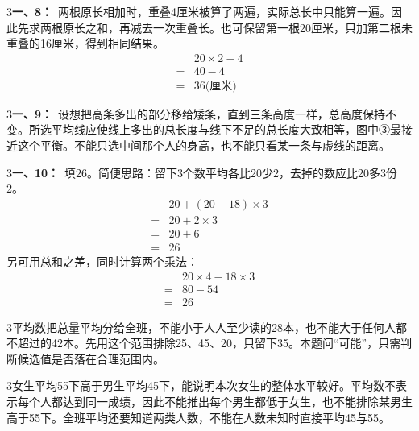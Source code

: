 \documentclass[multi=snippet,border={5bp 20bp 5bp 5bp}]{standalone}
\newenvironment{snippet}[3]{\begin{minipage}{#1bp}\color{answerred}\fontsize{#2}{#3}\selectfont\raggedright}{\end{minipage}}
\begin{document}
\begin{snippet}{505}{11.5}{14}\begin{multicols}{3}\raggedcolumns \textbf{一、8：}\ 两根原长相加时，重叠4厘米被算了两遍，实际总长中只能算一遍。因此先求两根原长之和，再减去一次重叠长。也可保留第一根20厘米，只加第二根未重叠的16厘米，得到相同结果。\[\begin{aligned}&20\times2-4\\={}&40-4\\={}&36\text{(厘米)}\end{aligned}\]\end{multicols}\end{snippet}
\begin{snippet}{505}{11.5}{14}\begin{multicols}{3}\raggedcolumns \textbf{一、9：}\ 设想把高条多出的部分移给矮条，直到三条高度一样，总高度保持不变。所选平均线应使线上多出的总长度与线下不足的总长度大致相等，图中③最接近这个平衡。不能只选中间那个人的身高，也不能只看某一条与虚线的距离。\end{multicols}\end{snippet}
\begin{snippet}{505}{11.5}{14}\begin{multicols}{3}\raggedcolumns \textbf{一、10：}\ 填\(26\)\allowbreak 。简便思路：留下3个数平均各比20少2，去掉的数应比20多3份2。\[\begin{aligned}&20+(20-18)\times3\\={}&20+2\times3\\={}&20+6\\={}&26\end{aligned}\]另可用总和之差，同时计算两个乘法：\[\begin{aligned}&20\times4-18\times3\\={}&80-54\\={}&26\end{aligned}\]\end{multicols}\end{snippet}
\begin{snippet}{505}{11.5}{14}\begin{multicols}{3}\raggedcolumns 平均数把总量平均分给全班，不能小于人人至少读的28本，也不能大于任何人都不超过的42本。先用这个范围排除25、45、20，只留下35。本题问“可能”，只需判断候选值是否落在合理范围内。\end{multicols}\end{snippet}
\begin{snippet}{505}{11.5}{14}\begin{multicols}{3}\raggedcolumns 女生平均55下高于男生平均45下，能说明本次女生的整体水平较好。平均数不表示每个人都达到同一成绩，因此不能推出每个男生都低于女生，也不能排除某男生高于55下。全班平均还要知道两类人数，不能在人数未知时直接平均45与55。\end{multicols}\end{snippet}
\end{document}
